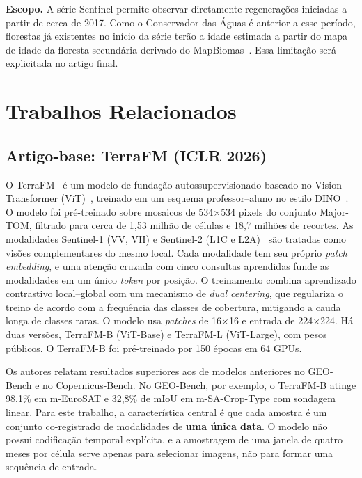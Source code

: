 \documentclass[conference]{IEEEtran}
\begin{document}
\textbf{Escopo.} A série Sentinel permite observar diretamente regenerações iniciadas a partir de cerca de 2017. Como o Conservador das Águas é anterior a esse período, florestas já existentes no início da série terão a idade estimada a partir do mapa de idade da floresta secundária derivado do MapBiomas~\citep{silva2020}. Essa limitação será explicitada no artigo final.

\section{Trabalhos Relacionados}\label{sec:relacionados}

\subsection{Artigo-base: TerraFM (ICLR 2026)}

O TerraFM~\citep{danish2026terrafm} é um modelo de fundação autossupervisionado baseado no Vision Transformer (ViT)~\citep{dosovitskiy2021}, treinado em um esquema professor--aluno no estilo DINO~\citep{caron2021}. O modelo foi pré-treinado sobre mosaicos de 534$\times$534 pixels do conjunto Major-TOM, filtrado para cerca de 1,53 milhão de células e 18,7 milhões de recortes. As modalidades Sentinel-1 (VV, VH) e Sentinel-2 (L1C e L2A)~\citep{torres2012,drusch2012} são tratadas como visões complementares do mesmo local. Cada modalidade tem seu próprio \textit{patch embedding}, e uma atenção cruzada com cinco consultas aprendidas funde as modalidades em um único \textit{token} por posição. O treinamento combina aprendizado contrastivo local--global com um mecanismo de \textit{dual centering}, que regulariza o treino de acordo com a frequência das classes de cobertura, mitigando a cauda longa de classes raras. O modelo usa \textit{patches} de 16$\times$16 e entrada de 224$\times$224. Há duas versões, TerraFM-B (ViT-Base) e TerraFM-L (ViT-Large), com pesos públicos. O TerraFM-B foi pré-treinado por 150 épocas em 64 GPUs.

Os autores relatam resultados superiores aos de modelos anteriores no GEO-Bench e no Copernicus-Bench. No GEO-Bench, por exemplo, o TerraFM-B atinge 98,1\% em m-EuroSAT e 32,8\% de mIoU em m-SA-Crop-Type com sondagem linear. Para este trabalho, a característica central é que cada amostra é um conjunto co-registrado de modalidades de \textbf{uma única data}. O modelo não possui codificação temporal explícita, e a amostragem de uma janela de quatro meses por célula serve apenas para selecionar imagens, não para formar uma sequência de entrada.
\end{document}
